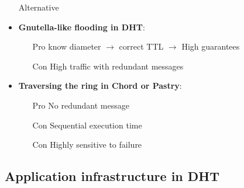 \begin{itemize}
    \item[Alternative]

    \item \textbf{Gnutella-like flooding in DHT}:
        \begin{itemize}
            \item[Pro] know diameter $\to$ correct TTL $\to$ High guarantees
            \item[Con] High traffic with redundant messages
        \end{itemize}

    \item \textbf{Traversing the ring in Chord or Pastry}:
        \begin{itemize}
            \item[Pro] No redundant message
            \item[Con] Sequential execution time
            \item[Con] Highly sensitive to failure
        \end{itemize}
\end{itemize}


\subsection{Application infrastructure in DHT}
